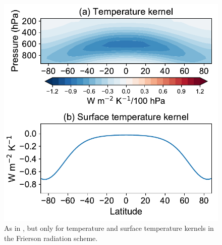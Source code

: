 \begin{figure}[ht]
	\centering
	\includegraphics[width=0.45\linewidth]{figs/polar_amp/kernels_frierson}
	\caption[Annual-mean and zonal-mean temperature and surface temperature radiative kernels for Frierson radiation scheme]{As in , but only for temperature and surface temperature kernels in the Frierson radiation scheme.}
	\label{fig:frierson_kernels}
\end{figure}


